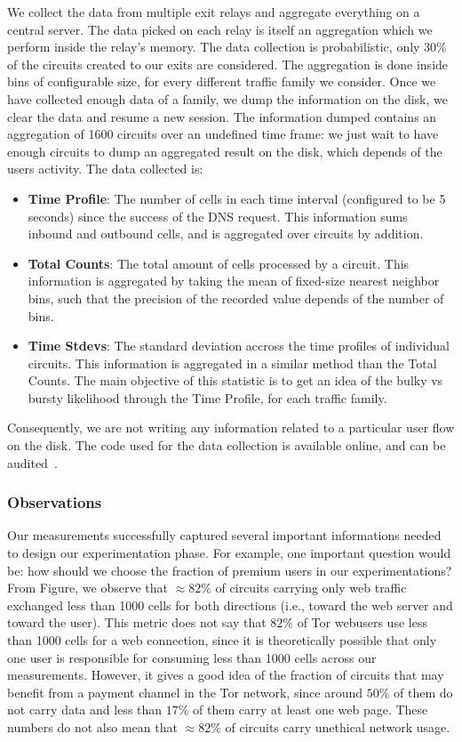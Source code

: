 We collect the data from multiple exit relays and aggregate everything on a central server. The data picked on each relay is itself an aggregation which we perform inside the relay's memory. The data collection is probabilistic, only 30\% of the circuits created to our exits are considered. The aggregation is done inside bins of configurable size, for every different traffic family we consider. Once we have collected enough data of a family, we dump the information on the disk, we clear the data and resume a new session. The information dumped contains an aggregation of 1600 circuits over an undefined time frame: we just wait to have enough circuits to dump an aggregated result on the disk, which depends of the users activity. The data collected is:
\begin{itemize}
	\item \textbf{Time Profile}: The number of cells in each time interval (configured to be 5 seconds) since the success of the DNS request. This information sums inbound and outbound cells, and is aggregated over circuits by addition.
	\item \textbf{Total Counts}: The total amount of cells processed by a circuit. This information is aggregated by taking the mean of fixed-size nearest neighbor bins, such that the precision of the recorded value depends of the number of bins.
	\item \textbf{Time Stdevs}: The standard deviation accross the time profiles of individual circuits. This information is aggregated in a similar method than the Total Counts. The main objective of this statistic is to get an idea of the bulky vs bursty likelihood through the Time Profile, for each traffic family.
\end{itemize}
Consequently, we are not writing any information related to a particular user flow on the disk. The code used for the data collection is available online, and can be audited~\cite{code-mt-stats}.

\subsubsection{Observations}

Our measurements successfully captured several important informations needed to design our experimentation phase. For example, one important question would be: how should we choose the fraction of premium users in our experimentations? From Figure, we observe that $\approx 82\%$ of circuits carrying only web traffic exchanged less than 1000 cells for both directions (i.e., toward the web server and toward the user). This metric does not say that $82\%$ of Tor webusers use less than 1000 cells for a web connection, since it is theoretically possible that only one user is responsible for consuming less than 1000 cells across our measurements. However, it gives a good idea of the fraction of circuits that may benefit from a payment channel in the Tor network, since around $50\%$ of them do not carry data and less than $17\%$ of them carry at least one web page. These numbers do not also mean that $\approx 82\%$ of circuits carry unethical network usage.

